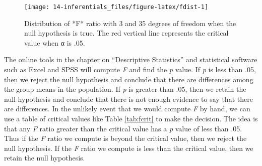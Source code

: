 \documentclass[
]{krantz}
\begin{document}
\begin{figure}

{\centering \texttt{[image: 14-inferentials\_files/figure-latex/fdist-1]} 

}

\caption{Distribution of *F* ratio with 3 and 35 degrees of freedom when the null hypothesis is true. The red vertical line represents the critical value when α is .05.}\label{fig:fdist}
\end{figure}

The online tools in the chapter on ``Descriptive Statistics'' and statistical software such as Excel and SPSS will compute \emph{F} and find the \emph{p} value. If \emph{p} is less than .05, then we reject the null hypothesis and conclude that there are differences among the group means in the population. If \emph{p} is greater than .05, then we retain the null hypothesis and conclude that there is not enough evidence to say that there are differences. In the unlikely event that we would compute \emph{F} by hand, we can use a table of critical values like Table \ref{tab:fcrit} to make the decision. The idea is that any \emph{F} ratio greater than the critical value has a \emph{p} value of less than .05. Thus if the \emph{F} ratio we compute is beyond the critical value, then we reject the null hypothesis. If the \emph{F} ratio we compute is less than the critical value, then we retain the null hypothesis.
\end{document}
